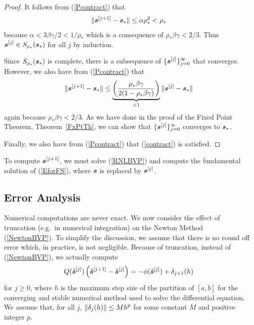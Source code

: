 \begin{proof}
It follows from (\ref{Pcontract}) that
\[
\| \bm{s}^{[j+1]} - \bm{s}_\ast \|
\leq \alpha \rho_\ast^2 < \rho_\ast
\]
because $\alpha < 3\beta\gamma/2 < 1/\rho_\ast$
which is a consequence of $\rho_\ast \beta \gamma < 2/3$.
Thus $\displaystyle \bm{s}^{[j]} \in S_{\rho_\ast}(\bm{s}_\ast)$ for
all $j$ by induction.

Since $S_{\rho_\ast}(\bm{s}_\ast)$ is complete, there is a subsequence of
$\displaystyle \{\bm{s}^{[j]}\}_{j=0}^\infty$ that converges.
However, we also have from (\ref{Pcontract}) that
\begin{equation} \label{CforNewtonFP}
\| \bm{s}^{[j+1]} - \bm{s}_\ast \|
\leq
\underbrace{\left(\frac{\rho_\ast \beta \gamma}{2(1-\rho_\ast \beta\gamma)}
\right)}_{<1} \| \bm{s}^{[j]} - \bm{s}_\ast \|
\end{equation}
again because $\rho_\ast \beta \gamma < 2/3$.  As we have done in the
proof of the Fixed Point Theorem, Theorem~\ref{FxPtTh}, we can show
that $\displaystyle \{\bm{s}^{[j]}\}_{j=0}^\infty$ converges to
$\bm{s}_\ast$.

Finally, we also have from (\ref{Pcontract}) that
(\ref{contract}) is satisfied.
\end{proof}

\begin{rmk}
To compute $\displaystyle \bm{s}^{[j+1]}$, we must solve
(\ref{RNLBVP}) and compute the fundamental solution of (\ref{EforFS}),
where $\bm{s}$ is replaced by $\displaystyle \bm{s}^{[j]}$.
\end{rmk}

\subsection{Error Analysis}

Numerical computations are never exact.  We now consider the
effect of truncation (e.g.\ in numerical integration) on the Newton
Method (\ref{NewtonBVP}).  To simplify the discussion, we assume that
there is no round off error which, in practice, is not negligible.
Because of truncation, instead of (\ref{NewtonBVP}), we actually
compute
\begin{equation} \label{NBVPtrunc}
Q(\tilde{\bm{s}}^{[j]}) \left( \tilde{\bm{s}}^{[j+1]}
- \tilde{\bm{s}}^{[j]}\right) =
- \phi(\tilde{\bm{s}}^{[j]}) + \delta_{j+1}(h)
\end{equation}
for  $j \geq 0$, where $h$ is the maximum step size of the partition
of $[a,b]$ for the converging and stable numerical method used to
solve the differential equation.  We assume that, for all $j$,
$\displaystyle \| \delta_j(h) \| \leq M h^p$ for some constant $M$ and positive
integer $p$.

